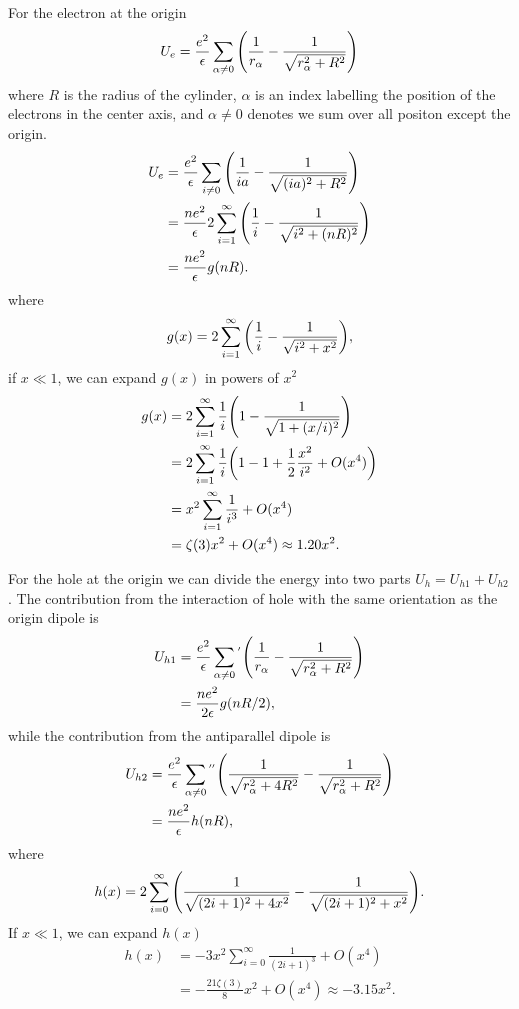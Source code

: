 \documentclass[10pt]{article}
\begin{document}
For the electron at the origin
\begin{equation}
	U_e = \frac{e^2}{\epsilon} \sum_{\alpha \neq 0} \qty(\frac{1}{r_{\alpha}} - \frac{1}{\sqrt{r_{\alpha}^2 + R^2}})
\end{equation}
where $R$ is the radius of the cylinder, $\alpha$ is an index labelling the position of the electrons in the center axis, and $\alpha \neq 0$ denotes we sum over all positon except the origin.
\begin{align*}
	U_e &= \frac{e^2}{\epsilon} \sum_{i \neq 0} \qty(\frac{1}{ia} - \frac{1}{\sqrt{(ia)^2 + R^2}}) \\
	&= \frac{ne^2}{\epsilon} 2\sum_{i=1}^{\infty} \qty(\frac{1}{i} - \frac{1}{\sqrt{i^2 + (nR)^2}}) \\
	&= \frac{ne^2}{\epsilon} g(nR).
\end{align*}
where
\begin{equation}
	g(x) = 2\sum_{i=1}^{\infty} \qty(\frac{1}{i} - \frac{1}{\sqrt{i^2 + x^2}}),
\end{equation}
if $x\ll 1$, we can expand $g(x)$ in powers of $x^2$
\begin{align*}
	g(x) &= 2\sum_{i=1}^{\infty} \frac{1}{i}\qty(1 - \frac{1}{\sqrt{1 + (x/i)^2}}) \\
	&= 2\sum_{i=1}^{\infty} \frac{1}{i}\qty(1 - 1 + \frac{1}{2} \frac{x^2}{i^2} + O(x^4))\\
	&= x^2 \sum_{i=1}^{\infty} \frac{1}{i^3} + O(x^4)\\
	&= \zeta(3) x^2 + O(x^4) \approx 1.20 x^2.
\end{align*}

For the hole at the origin we can divide the energy into two parts $U_h = U_{h1} + U_{h2}$. The contribution from the interaction of hole with the same orientation as the origin dipole is
\begin{align*}
	U_{h1} &= \frac{e^2}{\epsilon} \sum_{\alpha \neq 0}{}^{'} \qty(\frac{1}{r_{\alpha}} - \frac{1}{\sqrt{r_{\alpha}^2 + R^2}})\\
	&= \frac{ne^2}{2\epsilon} g(nR/2),
\end{align*}
while the contribution from the antiparallel dipole is
\begin{align*}
	U_{h2} &= \frac{e^2}{\epsilon} \sum_{\alpha \neq 0}{}^{''} \qty(\frac{1}{\sqrt{r_{\alpha}^2 + 4R^2}} - \frac{1}{\sqrt{r_{\alpha}^2 + R^2}}) \\
	&= \frac{ne^2}{\epsilon} h(nR),
\end{align*}
where
\begin{equation}
	h(x) = 2\sum_{i=0}^{\infty} \qty(\frac{1}{\sqrt{(2i+1)^2 + 4x^2}} - \frac{1}{\sqrt{(2i+1)^2 + x^2}}).
\end{equation}
If $x \ll 1$, we can expand $h(x)$
\begin{align*}
	h(x) &= -3x^2 \sum_{i=0}^{\infty} \frac{1}{(2i+1)^3} + O(x^4) \\
	&= -\frac{21 \zeta(3)}{8} x^2 +O(x^4) \approx -3.15x^2.
\end{align*}
\end{document}
